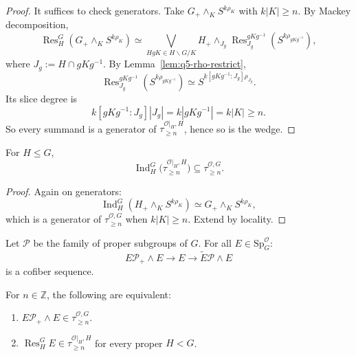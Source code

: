 \begin{proof}
It suffices to check generators.
Take $G_+\wedge_K S^{k\rho_K}$ with $k|K|\ge n$.
By Mackey decomposition,
\[
\operatorname{Res}^G_H(G_+\wedge_K S^{k\rho_K})
\simeq
\bigvee_{HgK\in H\backslash G/K}
H_+\wedge_{J_g}
\operatorname{Res}^{gKg^{-1}}_{J_g}(S^{k\rho_{gKg^{-1}}}),
\]
where $J_g:=H\cap gKg^{-1}$.
By Lemma~\ref{lem:q5-rho-restrict},
\[
\operatorname{Res}^{gKg^{-1}}_{J_g}(S^{k\rho_{gKg^{-1}}})
\simeq
S^{k[gKg^{-1}:J_g]\rho_{J_g}}.
\]
Its slice degree is
\[
k[gKg^{-1}:J_g]|J_g|
=k|gKg^{-1}|
=k|K|
\ge n.
\]
So every summand is a generator of $\tau^{\mathcal O|_H,H}_{\ge n}$, hence so is the wedge.
\end{proof}

\begin{lemma}\label{lem:q5-ind-preserve}
For $H\le G$,
\[
\operatorname{Ind}^G_H\bigl(\tau^{\mathcal O|_H,H}_{\ge n}\bigr)\subseteq \tau^{\mathcal O,G}_{\ge n}.
\]
\end{lemma}

\begin{proof}
Again on generators:
\[
\operatorname{Ind}^G_H\left(H_+\wedge_K S^{k\rho_K}\right)
\simeq
G_+\wedge_K S^{k\rho_K},
\]
which is a generator of $\tau^{\mathcal O,G}_{\ge n}$ when $k|K|\ge n$.
Extend by locality.
\end{proof}

\begin{lemma}\label{lem:q5-isotropy}
Let $\mathcal P$ be the family of proper subgroups of $G$. For all $E\in\mathrm{Sp}^{\mathcal O}_G$:
\[
E\mathcal P_+\wedge E\longrightarrow E\longrightarrow \widetilde E\mathcal P\wedge E
\]
is a cofiber sequence.
\end{lemma}

\begin{lemma}\label{lem:q5-proper}
For $n\in\mathbb Z$, the following are equivalent:
\begin{enumerate}
\item $E\mathcal P_+\wedge E\in \tau^{\mathcal O,G}_{\ge n}$.
\item $\operatorname{Res}^G_H E\in\tau^{\mathcal O|_H,H}_{\ge n}$ for every proper $H<G$.
\end{enumerate}
\end{lemma}


